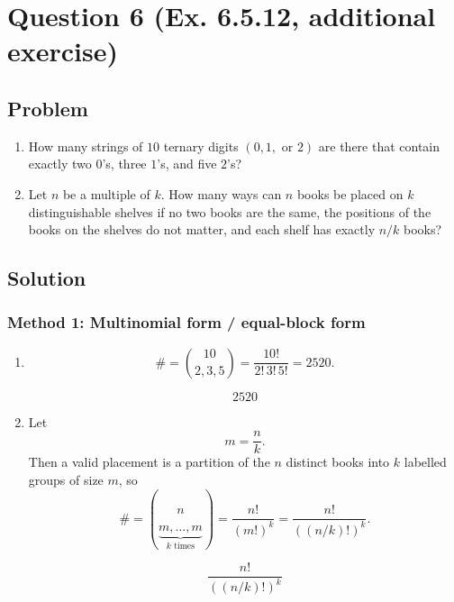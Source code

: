 \documentclass[12pt]{article}
\begin{document}
\newpage

\section{Question 6 (Ex. 6.5.12, additional exercise)}
\subsection{Problem}
\begin{enumerate}[label=(\alph*)]
\item How many strings of $10$ ternary digits $(0,1,\text{ or }2)$ are there that contain exactly two $0$'s, three $1$'s, and five $2$'s?
\item Let $n$ be a multiple of $k$. How many ways can $n$ books be placed on $k$ distinguishable shelves if no two books are the same, the positions of the books on the shelves do not matter, and each shelf has exactly $n/k$ books?
\end{enumerate}

\subsection{Solution}

\subsubsection{Method 1: Multinomial form / equal-block form}
\begin{enumerate}[label=(\alph*)]
\item
\[
\#=\binom{10}{2,3,5}
=\frac{10!}{2!\,3!\,5!}
=2520.
\]

\[
\boxed{2520}
\]

\item Let
\[
m=\frac{n}{k}.
\]
Then a valid placement is a partition of the \(n\) distinct books into \(k\) labelled groups of size \(m\), so
\[
\#=\binom{n}{\underbrace{m,\dots,m}_{k\text{ times}}}
=\frac{n!}{(m!)^k}
=\frac{n!}{\left((n/k)!\right)^k}.
\]

\[
\boxed{\frac{n!}{\left((n/k)!\right)^k}}
\]
\end{enumerate}

\newpage
\end{document}
